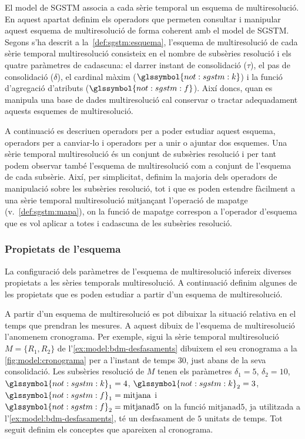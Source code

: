 El model de \gls{SGSTM} associa a cada sèrie temporal un esquema de
multiresolució. En aquest apartat definim els operadors que permeten
consultar i manipular aquest esquema de multiresolució de forma
coherent amb el model de \gls{SGSTM}.  Segons s'ha descrit a
la~\autoref{def:sgstm:esquema}, l'esquema de multiresolució de cada
sèrie temporal multiresolució consisteix en el nombre de subsèries
resolució i els quatre paràmetres de cadascuna: el darrer instant de
consolidació ($\tau$), el pas de consolidació ($\delta$), el cardinal
màxim ($\glssymbol{not:sgstm:k}$) i la funció d'agregació d'atributs
($\glssymbol{not:sgstm:f}$).  Així doncs, quan es manipula una base de
dades multiresolució cal conservar o tractar adequadament aquests
esquemes de multiresolució.


A continuació es descriuen operadors per a poder estudiar aquest
esquema, operadors per a canviar-lo i operadors per a unir o ajuntar
dos esquemes.  Una sèrie temporal multiresolució és un conjunt de
subsèries resolució i per tant podem observar també l'esquema de
multiresolució com a conjunt de l'esquema de cada subsèrie.  Així, per
simplicitat, definim la majoria dels operadors de manipulació sobre
les subsèries resolució, tot i que es poden estendre fàcilment a una sèrie
temporal multiresolució mitjançant l'operació de mapatge
(v.~\autoref{def:sgstm:mapa}), on la funció de mapatge
correspon a l'operador d'esquema que es vol aplicar a totes i
cadascuna de les subsèries resolució.




\subsubsection{Propietats de l'esquema}


La configuració dels paràmetres de l'esquema de multiresolució
infereix diverses propietats a les sèries temporals multiresolució. A
continuació definim algunes de les propietats que es poden estudiar a
partir d'un esquema de multiresolució.


A partir d'un esquema de multiresolució es pot dibuixar la situació
relativa en el temps que prendran les mesures. A aquest dibuix de
l'esquema de multiresolució l'anomenem cronograma. Per exemple, sigui
la sèrie temporal multiresolució $M = \{R_1,R_2\}$ de
l'\autoref{ex:model:bdm-desfasaments} dibuixem el seu cronograma a la
\autoref{fig:model:cronograma} per a l'instant de temps $30$, just
abans de la seva consolidació. Les subsèries resolució de $M$ tenen
els paràmetres $\delta_1=5$, $\delta_2=10$,
$\glssymbol{not:sgstm:k}_1=4$, $\glssymbol{not:sgstm:k}_2=3$,
$\glssymbol{not:sgstm:f}_1=\text{mitjana}$ i
$\glssymbol{not:sgstm:f}_2=\text{mitjanad5}$ on la funció
$\text{mitjanad5}$, ja utilitzada a
l'\autoref{ex:model:bdm-desfasaments}, té un desfasament de $5$
unitats de temps. Tot seguit definim els conceptes que apareixen al
cronograma.

